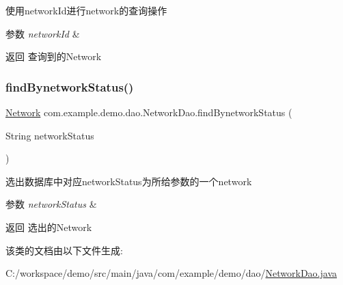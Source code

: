 使用network\+Id进行network的查询操作 
\begin{DoxyParams}{参数}
{\em network\+Id} & \\
\hline
\end{DoxyParams}
\begin{DoxyReturn}{返回}
查询到的\+Network 
\end{DoxyReturn}
\mbox{\label{interfacecom_1_1example_1_1demo_1_1dao_1_1_network_dao_ad4c0cc2d9c234006900bd0bd0718069a}} 
\subsubsection{\texorpdfstring{find\+Bynetwork\+Status()}{findBynetworkStatus()}}
{\footnotesize\ttfamily \mbox{\hyperlink{classcom_1_1example_1_1demo_1_1modular_1_1_network}{Network}} com.\+example.\+demo.\+dao.\+Network\+Dao.\+find\+Bynetwork\+Status (\begin{DoxyParamCaption}\item[{String}]{network\+Status }\end{DoxyParamCaption})}

选出数据库中对应network\+Status为所给参数的一个network 
\begin{DoxyParams}{参数}
{\em network\+Status} & \\
\hline
\end{DoxyParams}
\begin{DoxyReturn}{返回}
选出的\+Network 
\end{DoxyReturn}


该类的文档由以下文件生成\+:\begin{DoxyCompactItemize}
\item 
C\+:/workspace/demo/src/main/java/com/example/demo/dao/\mbox{\hyperlink{_network_dao_8java}{Network\+Dao.\+java}}\end{DoxyCompactItemize}
